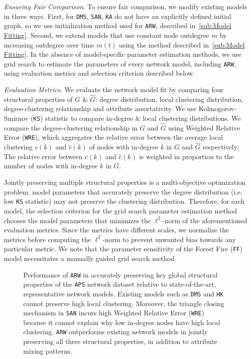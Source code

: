 \textit{Ensuring Fair Comparison}. To ensure fair comparison, we modify existing models in three ways.
First, for \texttt{DMS}, \texttt{SAN}, \texttt{KA} do not have an explicitly defined initial graph,
so we use initialization method used for \texttt{ARW}, described in~\cref{sub:Model Fitting}. Second, we extend
models that use constant node outdegree $m$ by increasing outdegree over time $m(t)$
using the method described in~\cref{sub:Model Fitting}. In the absence of model-specific parameter estimation methods,
we use grid search to estimate the parameters of every network model, including \texttt{ARW},
using evaluation metrics and selection criterion described below.

\textit{Evaluation Metrics}.
We evaluate the network model fit by comparing four structural properties of ${G}$ \& $\hat{G}$:
degree distribution, local clustering distribution, degree-clustering relationship
and attribute assortativity. We use Kolmogorov-Smirnov (\texttt{KS}) statistic to compare in-degree
\& local clustering distributions. We compare the degree-clustering relationship in $G$ and $\hat{G}$ using
Weighted Relative Error (\texttt{WRE}), which aggregates the relative error
between the average local clustering $c(k)$ and $\hat{c}(k)$ of nodes with in-degree $k$
in $G$ and $\hat{G}$ respectively; The relative error between $c(k)$ and $\hat{c}(k)$
is weighted in proportion to the number of nodes with in-degree $k$ in $G$.

Jointly preserving multiple structural properties is a multi-objective optimization
problem; model parameters that accurately preserve the degree distribution
(i.e. low \texttt{KS} statistic) may not preserve the clustering distribution.
Therefore, for each model, the selection criterion for the grid search parameter estimation method
chooses the model parameters that minimizes the $\ell^2$-norm of the aforementioned evaluation metrics.
Since the metrics have different scales, we normalize the metrics before computing the $\ell^2$-norm
to prevent unwanted bias towards any particular metric.
We note that the parameter sensitivity of the Forest Fire (\texttt{FF}) model necessitates
a manually guided grid search method.

\begin{figure*}
	\centering
	\caption{
		Performance of \texttt{ARW} in accurately preserving key global structural properties
		of the \texttt{APS} network dataset relative to state-of-the-art, representative
		network models. Existing models such as \texttt{DMS} and \texttt{HK} cannot preserve high
		local clustering.
		Moreover, the triangle closing mechanism in \texttt{SAN} incurs high Weighted Relative Error (\texttt{WRE}) because
		it cannot explain why low in-degree nodes have high local clustering. \texttt{ARW} outperforms existing network models
		in jointly preserving all three structural properties, in addition to attribute mixing patterns.}
	\label{fig:aps_fits}
\end{figure*}

